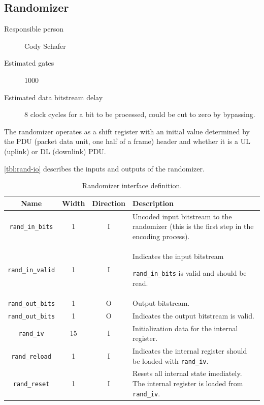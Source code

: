 \documentclass[dvips,10pt,twocolumn]{article}
\begin{document}

\subsection{Randomizer}
\label{sec:rand}
\begin{description}
	\item[Responsible person] Cody Schafer 
	\item[Estimated gates] 1000
	\item[Estimated data bitstream delay] 8 clock cycles for a bit to be
		processed, could be cut to zero by bypassing.
\end{description}

The randomizer operates as a shift register with an initial value
determined by the PDU (packet data unit, one half of a frame) header
and whether it is a UL (uplink) or DL (downlink) PDU.

\autoref{tbl:rand-io} describes the inputs and outputs of the
randomizer.

\begin{table} \begin{tabularx}{\textwidth}{c|c|c|X}
	\label{tbl:rand-io}
	Name & Width & Direction & Description \\ \hline

	\texttt{rand\_in\_bits}  & 1  & I & Uncoded input bitstream to the
	randomizer (this is the first step in the encoding process).\\

	\texttt{rand\_in\_valid} & 1  & I & Indicates the input bitstream

	\texttt{rand\_in\_bits} is valid and should be read. \\

	\texttt{rand\_out\_bits} & 1  & O & Output bitstream. \\
	
	\texttt{rand\_out\_bits} & 1  & O & Indicates the output bitstream
	is valid. \\

	\texttt{rand\_iv}        & 15 & I & Initialization data for the
	internal register. \\

	\texttt{rand\_reload}    & 1  & I & Indicates the internal
	register should be loaded with \texttt{rand\_iv}. \\

	\texttt{rand\_reset}     & 1  & I & Resets all internal state
	imediately. The internal register is loaded from
	\texttt{rand\_iv}.
\end{tabularx}
\caption{Randomizer interface definition.}
\end{table}
	
\end{document}
